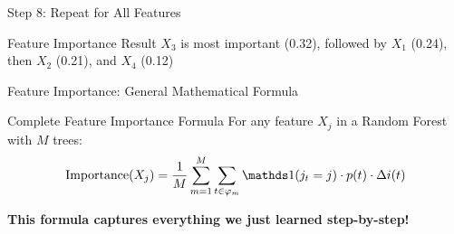 \documentclass[10pt]{beamer}
\begin{document}
\begin{frame}{Step 8: Repeat for All Features}
\begin{center}
\end{center}

\vspace{0.5cm}

\begin{keypointsbox}{Feature Importance Result}
$X_3$ is most important (0.32), followed by $X_1$ (0.24), then $X_2$ (0.21), and $X_4$ (0.12)
\end{keypointsbox}
\end{frame}

\begin{frame}{Feature Importance: General Mathematical Formula}
\begin{definitionbox}{Complete Feature Importance Formula}
For any feature $X_j$ in a Random Forest with $M$ trees:
$$\text{Importance}(X_j) = \frac{1}{M} \sum_{m=1}^M \sum_{t \in \varphi_{m}} \indicator(j_t = j) \cdot p(t) \cdot \Delta i(t)$$
\end{definitionbox}

\vspace{1cm}

\begin{alertbox}
\textbf{This formula captures everything we just learned step-by-step!}
\end{alertbox}
\end{frame}
\end{document}
